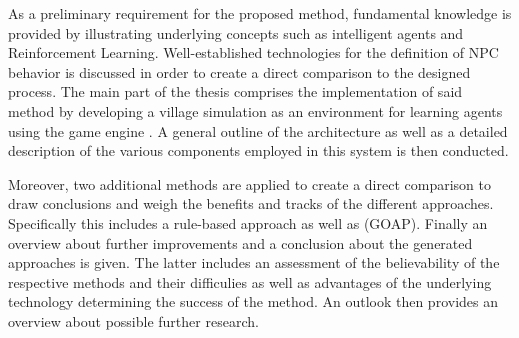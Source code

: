 As a preliminary requirement for the proposed method, fundamental knowledge is provided by illustrating underlying concepts such as intelligent agents and Reinforcement Learning. Well-established technologies for the definition of NPC behavior is discussed in order to create a direct comparison to the designed process. The main part of the thesis comprises the implementation of said method by developing a village simulation as an environment for learning agents using the game engine . A general outline of the architecture as well as a detailed description of the various components employed in this system is then conducted.

Moreover, two additional methods are applied to create a direct comparison to draw conclusions and weigh the benefits and tracks of the different approaches. Specifically this includes a rule-based approach as well as  (GOAP).
Finally an overview about further improvements and a conclusion about the generated approaches is given. The latter includes an assessment of the believability of the respective methods and their difficulies as well as advantages of the underlying technology determining the success of the method. An outlook then provides an overview about possible further research.





